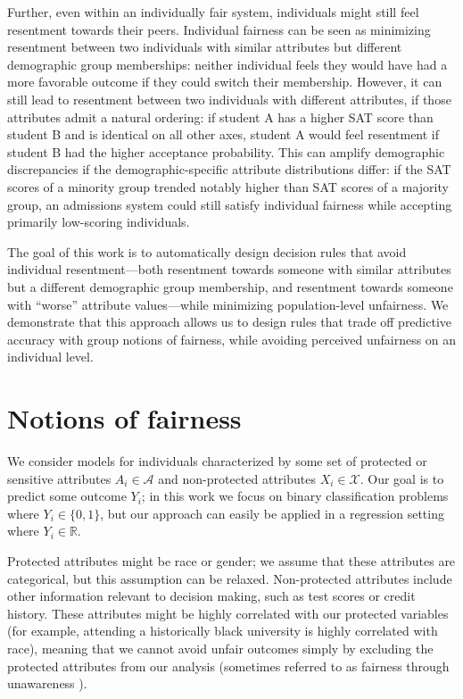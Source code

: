     Further, even within an individually fair system, individuals might still feel resentment towards their peers. Individual fairness can be seen as minimizing resentment between two individuals with similar attributes but different demographic group memberships: neither individual feels they would have had a more favorable outcome if they could switch their membership. However, it can still lead to resentment between two individuals with different attributes, if those attributes admit a natural ordering: if student A has a higher SAT score than student B and is identical on all other axes, student A would feel resentment if student B had the higher acceptance probability. This can amplify demographic discrepancies if the demographic-specific attribute distributions differ: if the SAT scores of a minority group trended notably higher than SAT scores of a majority group, an admissions system could still satisfy individual fairness while accepting primarily low-scoring individuals.

    The goal of this work is to automatically design decision rules that avoid individual resentment---both resentment towards someone with similar attributes but a different demographic group membership, and resentment towards someone with ``worse'' attribute values---while minimizing population-level unfairness. We demonstrate that this approach allows us to design rules that trade off predictive accuracy with group notions of fairness, while avoiding perceived unfairness on an individual level.

\section{Notions of fairness}\label{sec:bg}
    \label{sec:monofair_background}
    
    We consider models for individuals characterized by some set of protected or sensitive attributes $A_i \in \mathcal{A}$ and non-protected attributes $X_i \in \mathcal{X}$. Our goal is to predict some outcome $Y_i$; in this work we focus on binary classification problems where $Y_i \in \{0, 1\}$, but our approach can easily be applied in a regression setting where $Y_i\in \mathbb{R}$.

    Protected attributes might be race or gender; we assume that these attributes are categorical, but this assumption can be relaxed. Non-protected attributes include other information relevant to decision making, such as test scores or credit history. These attributes might be highly correlated with our protected variables (for example, attending a historically black university is highly correlated with race), meaning that we cannot avoid unfair outcomes simply by excluding the protected attributes from our analysis (sometimes referred to as fairness through unawareness \citep{dwork2012fairness}).

